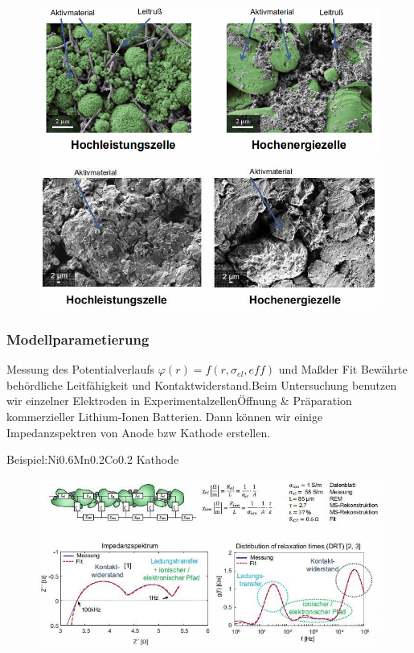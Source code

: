 \documentclass[12pt,UTF8]{article}
\begin{document}
\begin{figure}[H]
    \centering
    \begin{minipage}[t]{0.4\linewidth}
        \centering
        \includegraphics[width=\linewidth]{Diagramme/fig3_1_7.png}
    \end{minipage}
    \begin{minipage}[t]{0.4\linewidth}
        \centering
        \includegraphics[width=\linewidth]{Diagramme/fig3_1_8.jpg}
    \end{minipage}
    \caption{}
\end{figure}

\subsubsection{Modellparametierung}
Messung des Potentialverlaufs $\varphi(r)=f(r,\sigma_{el},eff)$ und Maßder Fit Bewährte behördliche Leitfähigkeit und Kontaktwiderstand.Beim Untersuchung  benutzen wir einzelner Elektroden in ExperimentalzellenÖffnung \& Präparation kommerzieller Lithium-Ionen Batterien. Dann können wir einige Impedanzspektren von Anode bzw Kathode erstellen.

Beispiel:Ni0.6Mn0.2Co0.2 Kathode

\begin{figure}[H]
    \centering
    \includegraphics[width=.8\linewidth]{Diagramme/fig3_1_9.jpg}
    \caption{}
\end{figure}
\end{document}
